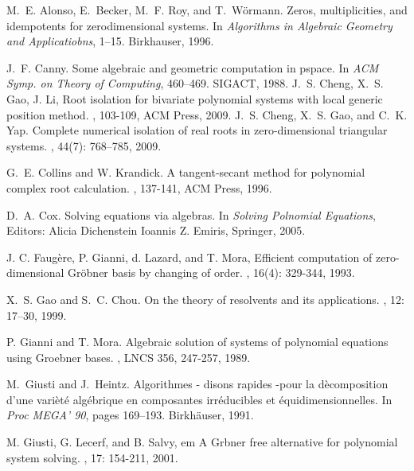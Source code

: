 \documentclass[amsthm]{JSC_LaTex_2007_Mar_12/elsart}
\begin{document}
\begin{thebibliography}{99}
M.~E. Alonso, E.~Becker, M.~F. Roy, and T.~W{\"{o}}rmann.
\newblock Zeros, multiplicities, and idempotents for zerodimensional systems.
\newblock In {\em Algorithms in Algebraic Geometry and Applicatiobns},
  1--15. Birkhauser, 1996.


J.~F. Canny.
\newblock Some algebraic and geometric computation in pspace.
\newblock In {\em ACM Symp. on Theory of Computing}, 460--469. SIGACT,
  1988.
J.~S. Cheng, X.~S. Gao, J. Li,
\newblock Root isolation for bivariate polynomial
systems with local generic position method.
,
103-109, ACM Press, 2009.
J.~S. Cheng, X.~S. Gao, and C.~K. Yap.
\newblock Complete numerical isolation of real roots in zero-dimensional
  triangular systems.
, 44(7): 768--785, 2009.

G.~E. Collins and W. Krandick.
\newblock A tangent-secant method for
polynomial complex root calculation.
,
137-141, ACM Press, 1996.

D.~A. Cox.
\newblock Solving equations via algebras.
\newblock In {\em Solving Polnomial Equations}, Editors: Alicia Dichenstein  Ioannis Z. Emiris, Springer, 2005.

 J. C. Faug\`{e}re, P. Gianni, d. Lazard, and T. Mora,
\newblock Efficient computation of zero-dimensional Gr\"{o}bner basis by
changing of order.
, 16(4): 329-344, 1993.

X.~S. Gao and S.~C. Chou.
\newblock On the theory of resolvents and its applications.
, 12: 17--30, 1999.


P. Gianni and T. Mora.
 \newblock Algebraic solution of systems of polynomial equations using Groebner bases.
 , LNCS 356, 247-257, 1989.



M.~Giusti and J.~Heintz.
\newblock Algorithmes - disons rapides -pour la d\`ecomposition d'une
  vari\`et\'e alg\'ebrique en composantes irr\'educibles et
  \'equidimensionnelles.
\newblock In {\em Proc MEGA' 90}, pages 169--193. Birkh{\"a}user, 1991.

 M. Giusti, G. Lecerf, and B. Salvy,
\newblock em A Grbner free alternative for polynomial system solving.
 , 17: 154-211, 2001.


\end{thebibliography}
\end{document}
